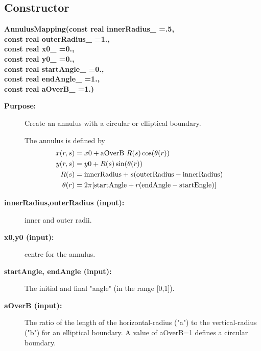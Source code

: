 \subsection{Constructor}
 
\newlength{\AnnulusMappingIncludeArgIndent}
\begin{flushleft} \textbf{%
\settowidth{\AnnulusMappingIncludeArgIndent}{AnnulusMapping(}%
AnnulusMapping(const real innerRadius\_  =.5, \\ 
\hspace{\AnnulusMappingIncludeArgIndent}const real outerRadius\_  =1., \\ 
\hspace{\AnnulusMappingIncludeArgIndent}const real x0\_           =0., \\ 
\hspace{\AnnulusMappingIncludeArgIndent}const real y0\_           =0., \\ 
\hspace{\AnnulusMappingIncludeArgIndent}const real startAngle\_   =0.,\\ 
\hspace{\AnnulusMappingIncludeArgIndent}const real endAngle\_     =1.,\\ 
\hspace{\AnnulusMappingIncludeArgIndent}const real aOverB\_  =1.)
}\end{flushleft}
\begin{description}
\item[{\bf Purpose:}]  Create an annulus with a circular or elliptical boundary.
 
 The annulus is defined by 
 \begin{align*}  
        x(r,s) &= x0 + {\rm aOverB}~ R(s)\cos(\theta(r)) \cr
        y(r,s) &= y0 +        R(s)\sin(\theta(r))    \cr   
        R(s) &= {\rm innerRadius} + s ({\rm outerRadius}-{\rm innerRadius})  \cr
        \theta(r) &= 2 \pi [{\rm startAngle} + r ({\rm endAngle}-{\rm startEngle})] 
 \end{align*} 
\item[{\bf innerRadius,outerRadius (input):}]   inner and outer radii.
\item[{\bf x0,y0 (input):}]  centre for the annulus.
\item[{\bf startAngle, endAngle (input):}]  The initial and final "angle" (in the range [0,1]).
\item[{\bf aOverB (input):}]  The ratio of the length of the horizontal-radius ("a") to the vertical-radius ("b")
  for an elliptical boundary. A value of aOverB=1 defines a circular boundary. 
 
\end{description}
